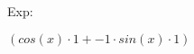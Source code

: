 \documentclass[12pt]{article}
\begin{document}
Exp: 
\begin{center}
$ (cos\left(x\right) \cdot 1 + -1 \cdot sin\left(x\right) \cdot 1) $
\end{center}
\end{document}
